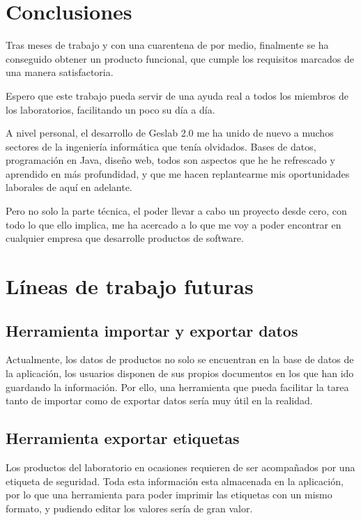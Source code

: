 
\section{Conclusiones}

Tras meses de trabajo y con una cuarentena de por medio, finalmente se ha conseguido obtener un producto funcional, que cumple los requisitos marcados de una manera satisfactoria. 

Espero que este trabajo pueda servir de una ayuda real a todos los miembros de los laboratorios, facilitando un poco su día a día.

A nivel personal, el desarrollo de Geslab 2.0 me ha unido de nuevo a muchos sectores de la ingeniería informática que tenía olvidados. Bases de datos, programación en Java, diseño web, todos son aspectos que he he refrescado y aprendido en más profundidad, y que me hacen replantearme mis oportunidades laborales de aquí en adelante.

Pero no solo la parte técnica, el poder llevar a cabo un proyecto desde cero, con todo lo que ello implica, me ha acercado a lo que me voy a poder encontrar en cualquier empresa que desarrolle productos de software.

\section{Líneas de trabajo futuras}

\subsection{Herramienta importar y exportar datos} 
Actualmente, los datos de productos no solo se encuentran en la base de datos de la aplicación, los usuarios disponen de sus propios documentos en los que han ido guardando la información. Por ello, una herramienta que pueda facilitar la tarea tanto de importar como de exportar datos sería muy útil en la realidad.

\subsection{Herramienta exportar etiquetas}
Los productos del laboratorio en ocasiones requieren de ser acompañados por una etiqueta de seguridad. Toda esta información esta almacenada en la aplicación, por lo que una herramienta para poder imprimir las etiquetas con un mismo formato, y pudiendo editar los valores sería de gran valor. 

